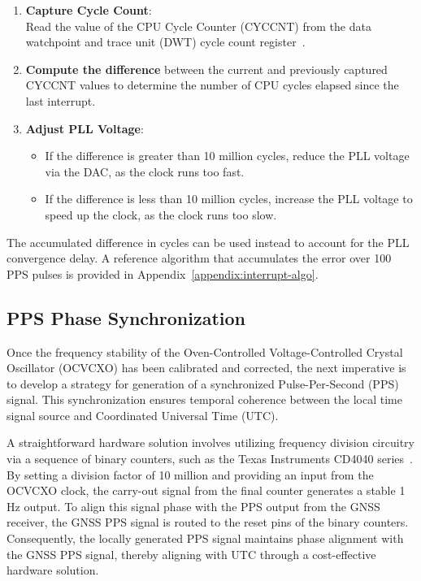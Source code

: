 \documentclass[12pt, a4paper]{extarticle}
\begin{document}
\begin{enumerate}[noitemsep]
    \item \textbf{Capture Cycle Count}: \\
        Read the value of the CPU Cycle Counter (CYCCNT) from the
        data watchpoint and trace unit (DWT) cycle count register~\cite{stm-rm}.
    \item \textbf{Compute the difference} between the current and previously captured
        CYCCNT values to determine the number of CPU cycles elapsed since the
        last interrupt.
    \item \textbf{Adjust PLL Voltage}:
        \begin{itemize}[noitemsep]
        \item If the difference is greater than 10 million cycles, reduce
            the PLL voltage via the DAC, as the clock runs too fast.
        \item If the difference is less than 10 million cycles, increase
            the PLL voltage to speed up the clock, as the clock runs too slow.
    \end{itemize}
\end{enumerate}

The accumulated difference in cycles can be used instead to account for the PLL
convergence delay. A reference algorithm that accumulates the error over 100
PPS pulses is provided in Appendix~\ref{appendix:interrupt-algo}.

\subsection{PPS Phase Synchronization}

Once the frequency stability of the Oven-Controlled Voltage-Controlled Crystal
Oscillator (OCVCXO) has been calibrated and corrected, the next imperative is
to develop a strategy for generation of a synchronized Pulse-Per-Second (PPS)
signal. This synchronization ensures temporal coherence between the local time
signal source and Coordinated Universal Time (UTC).

A straightforward hardware solution involves utilizing frequency division
circuitry via a sequence of binary counters, such as the Texas Instruments
CD4040 series~\cite{cd4040}. By setting a division factor of 10 million and
providing an input from the OCVCXO clock, the carry-out signal from the final
counter generates a stable 1 Hz output. To align this signal phase with the PPS
output from the GNSS receiver, the GNSS PPS signal is routed to the reset pins
of the binary counters. Consequently, the locally generated PPS signal
maintains phase alignment with the GNSS PPS signal, thereby aligning with UTC
through a cost-effective hardware solution.
\end{document}

